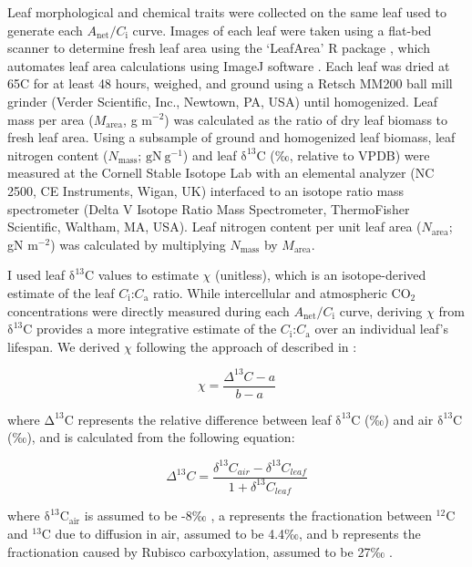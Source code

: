 Leaf morphological and chemical traits were collected on the same leaf used to generate each $A_\mathrm{net}/C_\mathrm{i}$ curve. Images of each leaf were taken using a flat-bed scanner to determine fresh leaf area using the ‘LeafArea’ R package , which automates leaf area calculations using ImageJ software . Each leaf was dried at 65\textdegree{}C for at least 48 hours, weighed, and ground using a Retsch MM200 ball mill grinder (Verder Scientific, Inc., Newtown, PA, USA) until homogenized. Leaf mass per area ($M_\mathrm{area}$, g m$^{-2}$) was calculated as the ratio of dry leaf biomass to fresh leaf area. Using a subsample of ground and homogenized leaf biomass, leaf nitrogen content ($N_\mathrm{mass}$; $\mathrm{gN\ g^{-1}}$) and leaf $\mathrm{\delta^{13}C}$ (‰, relative to VPDB) were measured at the Cornell Stable Isotope Lab with an elemental analyzer (NC 2500, CE Instruments, Wigan, UK) interfaced to an isotope ratio mass spectrometer (Delta V Isotope Ratio Mass Spectrometer, ThermoFisher Scientific, Waltham, MA, USA). Leaf nitrogen content per unit leaf area ($N_\mathrm{area}$; gN m$^{-2}$) was calculated by multiplying $N_\mathrm{mass}$ by $M_\mathrm{area}$.

I used leaf $\mathrm{\delta^{13}}$C values to estimate $\chi$ (unitless), which is an isotope-derived estimate of the leaf $C_\mathrm{i}$:$C_\mathrm{a}$ ratio. While intercellular and atmospheric CO$_2$ concentrations were directly measured during each $A_\mathrm{net}/C_\mathrm{i}$ curve, deriving $\chi$ from $\mathrm{\delta^{13}}$C provides a more integrative estimate of the $C_\mathrm{i}$:$C_\mathrm{a}$ over an individual leaf’s lifespan. We derived $\chi$ following the approach of  described in :

\begin{equation} \label{eq_2.1}
    \chi= \frac{\Delta^{13}C-a}{b-a}
\end{equation}

\noindent where $\mathrm{\Delta^{13}}$C represents the relative difference between leaf $\mathrm{\delta^{13}}$C (‰) and air $\mathrm{\delta^{13}}$C (‰), and is calculated from the following equation:

\begin{equation} \label{eq_2.2}
    \Delta^{13}C= \frac{\delta^{13}C_{air}-\delta^{13}C_{leaf}}{1+\delta^{13}C_{leaf}}
\end{equation}
    
\noindent where $\mathrm{\delta^{13}C_{air}}$ is assumed to be -8‰ , a represents the fractionation between $^{12}$C and $^{13}$C due to diffusion in air, assumed to be 4.4‰, and b represents the fractionation caused by Rubisco carboxylation, assumed to be 27‰ .
    
